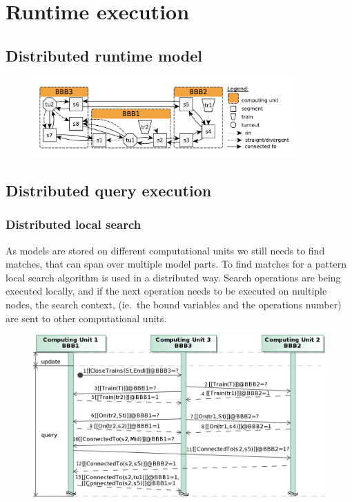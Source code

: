 %
\chapter{Runtime execution}
%


\section{Distributed runtime model}

\begin{figure}[h]
	\begin{center}
		\includegraphics[width=0.9\textwidth]{figures/runtime-snapshot.pdf}
	\end{center}
\end{figure}


\section{Distributed query execution}


\subsection{Distributed local search}

As models are stored on different computational units we still needs to find matches, that can span over multiple model parts. To find matches for a pattern local search algorithm is used in a distributed way. Search operations are being executed locally, and if the next operation needs to be executed on multiple nodes, the search context, (ie.\ the bound variables and the operations number) are sent to other computational units.

\begin{figure}[h]
	\begin{center}
		\includegraphics[width=1\textwidth]{figures/seq-diagram-query-exec.png}
	\end{center}
\end{figure}
